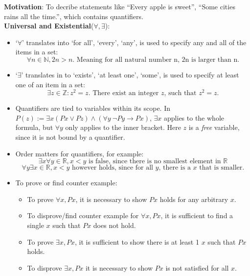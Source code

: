 \documentclass{article}
\begin{document}
\noindent
{
    \large 

\textbf{Motivation}: To decribe statements like ``Every apple is sweet'', ``Some cities rains all the time.'', 
which contains quantifiers.\\

\textbf{Universal and Existential}($\forall, \exists$): 
\begin{itemize}
    \item {`$\forall$' translates into `for all', `every', `any', is used to specify any and all of the items in a set:
        $$
        \forall n \in \mathbb{N}, 2n > n. \text{ Meaning for all natural number n, 2n is larger than n.}
        $$
    }
    \item {`$\exists$' translates in to `exists', `at least one', `some', is used to specify at least one of an item in a set:
    $$
    \exists z \in \mathbb{Z}: z^2 = z. \text{ There exist an integer $z$, such that $z^2 = z$.}
    $$
    }
    \item Quantifiers are tied to variables within its scope. In $P(z) := \exists x (Px\vee Pz) \wedge (\forall y\  \lnot Py \rightarrow Px)$, 
    $\exists x$ applies to the whole formula, but $\forall y$ only applies to the inner bracket. Here $z$ is a \emph{free} variable, 
    since it is not bound by a quantifier.
    \item Order matters for quantifiers, for example:$$
        \exists x \forall y \in \mathbb{R}, x < y \text{ is false, since there is no smallest element in $\mathbb{R}$}
    $$
    $$
        \forall y \exists x \in \mathbb{R}, x < y \text{ however holds, since for all $y$, there is a $x$ that is smaller.}
    $$
    \item To prove or find counter example: \begin{itemize}
        \item To prove $\forall x, Px$, it is necessary to show $Px$ holds for any arbitrary $x$.
        \item To disprove/find counter example for $\forall x, Px$, it is sufficient to find a single $x$ such that $Px$ does not hold.  
        \item To prove $\exists x, Px$, it is sufficient to show there is at least 1 $x$ such that $Px$ holds.
        \item To disprove $\exists x, Px$ it is necessary to show $Px$ is not satisfied for all $x$.    
    \end{itemize}
\end{itemize}



}
\end{document}
